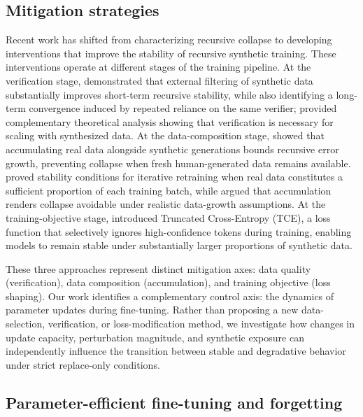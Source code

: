 \documentclass[a4paper,fleqn]{cas-dc}
\begin{document}
\subsection{Mitigation strategies}

Recent work has shifted from characterizing recursive collapse to developing
interventions that improve the stability of recursive synthetic training. These
interventions operate at different stages of the training pipeline.
At the verification stage, \citet{yi2025} demonstrated that external filtering
of synthetic data substantially improves short-term recursive stability, while
also identifying a long-term convergence induced by repeated reliance on the
same verifier; \citet{feng2025verification} provided complementary theoretical
analysis showing that verification is necessary for scaling with synthesized
data. At the data-composition stage, \citet{gerstgrasser2024} showed
that accumulating real data alongside synthetic generations bounds recursive
error growth, preventing collapse when fresh human-generated data remains
available. \citet{bertrand2024stability} proved stability conditions for
iterative retraining when real data constitutes a sufficient proportion of each
training batch, while \citet{gerstgrasser2024} argued that accumulation
renders collapse avoidable under realistic data-growth assumptions. At the
training-objective stage, \citet{zibakhsh2024} introduced
Truncated Cross-Entropy (TCE), a loss function that selectively ignores
high-confidence tokens during training, enabling models to remain stable under
substantially larger proportions of synthetic data.

These three approaches represent distinct mitigation axes: data quality
(verification), data composition (accumulation), and training objective (loss
shaping). Our work identifies a complementary control axis: the dynamics of
parameter updates during fine-tuning. Rather than proposing a new
data-selection, verification, or loss-modification method, we investigate how
changes in update capacity, perturbation magnitude, and synthetic exposure
can independently influence the transition between stable and degradative
behavior under strict replace-only conditions.

\subsection{Parameter-efficient fine-tuning and forgetting}
\end{document}
